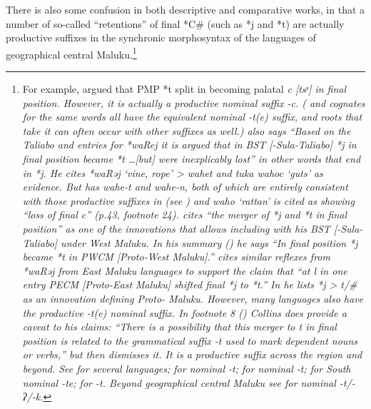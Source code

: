 There is also some confusion in both descriptive
and comparative works, in that a number of so-called “retentions”
of final *C{\#} (such as *j
and *t) are actually productive suffixes in the synchronic morphosyntax
of the languages of geographical central Maluku.\footnote{\label{fn:Collins-Final-t}
		For example, \citet[32]{Collins1981} argued that PMP *t split in  becoming
		palatal \it{c} [tsʸ] in final position.
		However, it is actually a productive nominal suffix \it{-c}.
		( and  cognates for the same
		words all have the equivalent nominal \it{-t(e)} suffix,
		and roots that take it can often occur with other suffixes as
		well.) \citet[34]{Collins1981} also says “Based on the Taliabo
		and  entries for *waRej it is argued that in BST [-Sula-Taliabo]
		*j in final position became *t {\ldots}[but] were inexplicably
		lost” in other words that end in *j.
		He cites *waRəj ‘vine,
		rope’ >  \it{wahet}
		and  \it{tuka wahoc} ‘guts’ as evidence.
		But  has \it{wahe-t}
		and \it{wahe-n}, both of which are entirely consistent with those
		productive suffixes in  (see \citealp[987]{GrimesGrimes2020})
		and  \it{waho} ‘rattan’ is cited as showing “loss of final
		\it{c}” (p.43, footnote 24).
		\citet[36]{Collins1981} cites “the merger of *j
		and *t in final position” as one of the innovations that allows
		including  with his BST [-Sula-Taliabo] under West  Maluku.
		In his summary (\citeyear[38]{Collins1981}) he says “In final position *j became
		*t in PWCM [Proto-West  Maluku].”
		\citet[39--40]{Collins1981} cites similar reflexes from *waRəj from
		East  Maluku languages to support the claim that “at l
		in one entry PECM [Proto-East  Maluku] shifted final *j to *t.”
		In \citet[40]{Collins1981} he lists *j > \it{t}/{\gap}{\#}
		as an innovation defining Proto- Maluku.
		However, many  languages also have the
		productive \it{-t(e)} nominal suffix.
		In footnote 8 (\citeyear[42]{Collins1981}) Collins does provide a caveat to his
		claims: “There is a possibility that this merger to \it{t} in
		final position is related to the grammatical suffix \it{-t} used
		to mark dependent nouns or verbs,” but then dismisses it.
		It is a productive suffix across the region and beyond.
		See \citet[30--33]{Collins1983} for several languages; \citet[xxx]{Collins2003a}
		for  nominal \it{-t}; \citet{Grimes1991c} for  nominal
		\it{-t}; \citet{Bolton1990} for South  nominal \it{-te;}
		\citet{Travis2019} for  \it{-t}.
		Beyond geographical central Maluku see \citet{Tamelan2021} for
		 nominal \it{-t/-ʔ/-k}.}
